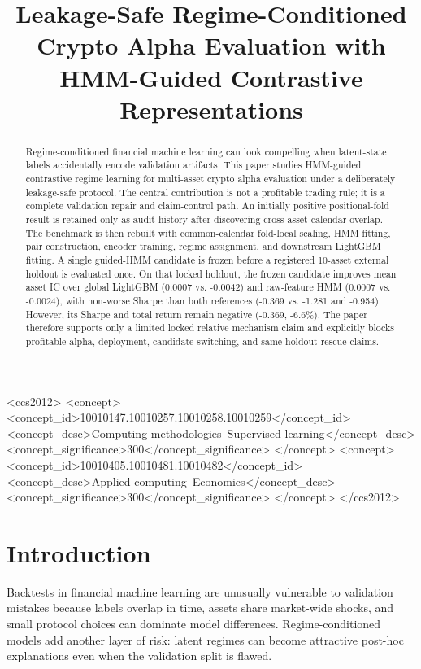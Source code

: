 \documentclass[sigconf,anonymous,review]{acmart}
\title{Leakage-Safe Regime-Conditioned Crypto Alpha Evaluation with HMM-Guided Contrastive Representations}
\begin{document}
\begin{abstract}
Regime-conditioned financial machine learning can look compelling when latent-state labels accidentally encode validation artifacts. This paper studies HMM-guided contrastive regime learning for multi-asset crypto alpha evaluation under a deliberately leakage-safe protocol. The central contribution is not a profitable trading rule; it is a complete validation repair and claim-control path. An initially positive positional-fold result is retained only as audit history after discovering cross-asset calendar overlap. The benchmark is then rebuilt with common-calendar fold-local scaling, HMM fitting, pair construction, encoder training, regime assignment, and downstream LightGBM fitting. A single guided-HMM candidate is frozen before a registered 10-asset external holdout is evaluated once. On that locked holdout, the frozen candidate improves mean asset IC over global LightGBM (0.0007 vs. -0.0042) and raw-feature HMM (0.0007 vs. -0.0024), with non-worse Sharpe than both references (-0.369 vs. -1.281 and -0.954). However, its Sharpe and total return remain negative (-0.369, -6.6\%). The paper therefore supports only a limited locked relative mechanism claim and explicitly blocks profitable-alpha, deployment, candidate-switching, and same-holdout rescue claims.
\end{abstract}

\begin{CCSXML}
<ccs2012>
   <concept>
       <concept_id>10010147.10010257.10010258.10010259</concept_id>
       <concept_desc>Computing methodologies~Supervised learning</concept_desc>
       <concept_significance>300</concept_significance>
       </concept>
   <concept>
       <concept_id>10010405.10010481.10010482</concept_id>
       <concept_desc>Applied computing~Economics</concept_desc>
       <concept_significance>300</concept_significance>
       </concept>
</ccs2012>
\end{CCSXML}

\maketitle

\section{Introduction}
Backtests in financial machine learning are unusually vulnerable to validation mistakes because labels overlap in time, assets share market-wide shocks, and small protocol choices can dominate model differences. Regime-conditioned models add another layer of risk: latent regimes can become attractive post-hoc explanations even when the validation split is flawed.
\end{document}
